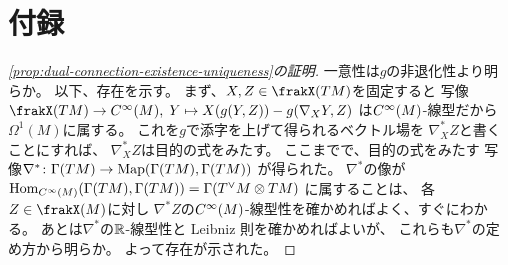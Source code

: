 \documentclass[report]{jlreq}
\begin{document}
{
    \renewcommand{\bibsection}{}
    
    
}

%
\newpage
\appendix
\renewcommand\thesection{\Alph{section}}
\setcounter{section}{0}
\section{付録}

\begin{proof}[\cref{prop:dual-connection-existence-uniqueness}の証明]
    一意性は$g$の非退化性より明らか。
    以下、存在を示す。
    まず、$X, Z \in \frakX(TM)$を固定すると
    写像$\frakX(TM) \to \smooth(M), \;
        Y \mapsto X(g(Y, Z)) - g(\nabla_X Y, Z)$
    は$C^\infty(M)$-線型だから$\Omega^1(M)$に属する。
    これを$g$で添字を上げて得られるベクトル場を
    $\nabla^*_X Z$と書くことにすれば、
    $\nabla^*_X Z$は目的の式をみたす。
    ここまでで、目的の式をみたす
    写像$\nabla^* \colon \Gamma(TM) \to \operatorname{Map}(\Gamma(TM), \Gamma(TM))$
    が得られた。
    $\nabla^*$の像が
    $\operatorname{Hom}_{C^\infty(M)}(\Gamma(TM), \Gamma(TM)) = \Gamma(T^\vee M \otimes TM)$
    に属することは、
    各$Z \in \frakX(M)$に対し
    $\nabla^* Z$の$C^\infty(M)$-線型性を確かめればよく、すぐにわかる。
    あとは$\nabla^*$の$\mathbb{R}$-線型性と Leibniz 則を確かめればよいが、
    これらも$\nabla^*$の定め方から明らか。
    よって存在が示された。
\end{proof}
\end{document}

